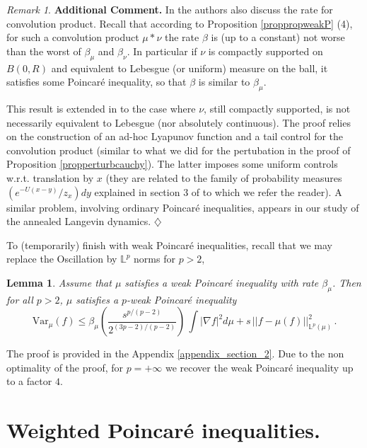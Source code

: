 \documentclass[11pt,reqno]{amsart}
\numberwithin{equation}{section}
\newtheorem{lemma}[theorem]{Lemma}
\theoremstyle{definition}
\theoremstyle{remark}
\newtheorem{remark}[theorem]{Remark}
\def \Var {\textrm{Var}}
\begin{document}
\begin{remark}\label{remadcom} \textbf{Additional Comment.} \quad In \cite{weakconvol} the authors also discuss the rate for convolution product. Recall that according to Proposition \ref{proppropweakP} (4), for such a convolution product $\mu*\nu$ the rate $\beta$ is (up to a constant) not worse than the worst of $\beta_\mu$ and $\beta_\nu$. In particular if $\nu$ is compactly supported on $B(0,R)$ and equivalent to Lebesgue (or uniform) measure on the ball, it satisfies some Poincar\'e inequality, so that $\beta$ is similar to $\beta_\mu$.

This result is extended in \cite{weakconvol} to the case where $\nu$, still compactly supported, is not necessarily equivalent to Lebesgue (nor absolutely continuous). The proof relies on the construction of an ad-hoc Lyapunov function and a tail control for the convolution product (similar to what we did for the pertubation in the proof of Proposition \ref{propperturbcauchy}). The latter imposes some uniform controls w.r.t. translation by $x$ (they are related to the family of probability measures $(e^{- U(x-y)}/z_x) dy$  explained in section 3 of \cite{weakconvol} to which we refer the reader). A similar problem, involving ordinary Poincar\'e inequalities, appears in our study \cite{CCG1} of the annealed Langevin dynamics.
\hfill $\diamondsuit$
\end{remark}

To (temporarily) finish with weak Poincar\'e inequalities, recall that we may replace the Oscillation by $\mathbb L^p$ norms for $p>2$,
\begin{lemma}\label{lemWPp}
Assume that $\mu$ satisfies a weak Poincar\'e inequality with rate $\beta_\mu$. Then for all $p>2$, $\mu$ satisfies a $p$-weak Poincar\'e inequality $$\Var_\mu(f) \leq \beta_\mu\left(\frac{s^{p/(p-2)}}{2^{({3}p-2)/(p-2)}}\right) \, \int |\nabla f|^2 d\mu + s \, ||f - \mu(f)||^2_{\mathbb L^p(\mu)} \, .$$
\end{lemma}
The proof is provided in the Appendix \ref{appendix_section_2}.
Due to the non optimality of the proof, for $p=+\infty$ we recover the weak Poincar\'e inequality up to a factor $4$.


\section{Weighted Poincar\'e inequalities.}\label{secweiP} 
\end{document}
